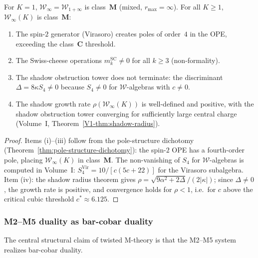 \begin{proposition}
\label{prop:M5-shadow-archetype}
For $K = 1$, $\mathcal{W}_\infty = \mathcal{W}_{1+\infty}$ is
class~$\mathbf{M}$ \textup{(}mixed, $r_{\max} = \infty$\textup{)}.
For all $K \ge 1$, $\mathcal{W}_\infty(K)$ is class~$\mathbf{M}$:
\begin{enumerate}[label=\textup{(\roman*)},nosep]
\item The spin-$2$ generator \textup{(}Virasoro\textup{)} creates
 poles of order~$4$ in the OPE, exceeding the class~$\mathbf{C}$
 threshold.
\item The Swiss-cheese operations $m_k^{\mathrm{SC}} \ne 0$ for
 all $k \ge 3$ \textup{(}non-formality\textup{)}.
\item The shadow obstruction tower does not terminate: the discriminant
 $\Delta = 8\kappa S_4 \ne 0$ because $S_4 \ne 0$ for
 $\mathcal{W}$-algebras with $c \ne 0$.
\item The shadow growth rate $\rho(\mathcal{W}_\infty(K))$
 is well-defined and positive, with the shadow obstruction tower
 converging for sufficiently large central charge
 (Volume~I, Theorem~\ref*{V1-thm:shadow-radius}).
\end{enumerate}
\end{proposition}

\begin{proof}
Items (i)--(iii) follow from the pole-structure
dichotomy
(Theorem~\ref{thm:pole-structure-dichotomy}):
the spin-$2$ OPE has a fourth-order pole,
placing $\mathcal{W}_\infty(K)$ in class~$\mathbf{M}$.
The non-vanishing of $S_4$ for $\mathcal{W}$-algebras
is computed in Volume~I:
$S_4^{\mathrm{Vir}} = 10/[c(5c + 22)]$
for the Virasoro subalgebra.
Item (iv): the shadow radius theorem gives
$\rho = \sqrt{9\alpha^2 + 2\Delta}/(2|\kappa|)$;
since $\Delta \ne 0$, the growth rate is positive,
and convergence holds for $\rho < 1$, i.e.\
for $c$ above the critical cubic threshold
$c^* \approx 6.125$.
\end{proof}

\subsubsection{M2--M5 duality as bar-cobar duality}

The central structural claim of twisted M-theory
is that the M2--M5 system realizes bar-cobar duality.

